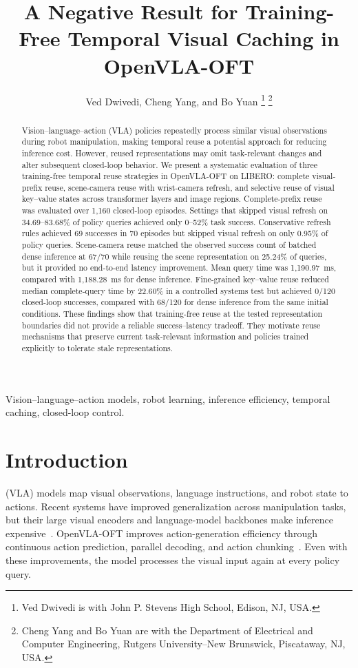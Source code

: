 \documentclass[journal]{IEEEtran}
\title{A Negative Result for Training-Free Temporal Visual Caching in OpenVLA-OFT}
\author{Ved Dwivedi, Cheng Yang, and Bo Yuan%
\thanks{Ved Dwivedi is with John P. Stevens High School, Edison, NJ, USA.}%
\thanks{Cheng Yang and Bo Yuan are with the Department of Electrical and Computer Engineering, Rutgers University--New Brunswick, Piscataway, NJ, USA.}}
\begin{document}
\maketitle

\begin{abstract}
Vision--language--action (VLA) policies repeatedly process similar visual observations during robot manipulation, making temporal reuse a potential approach for reducing inference cost. However, reused representations may omit task-relevant changes and alter subsequent closed-loop behavior. We present a systematic evaluation of three training-free temporal reuse strategies in OpenVLA-OFT on LIBERO: complete visual-prefix reuse, scene-camera reuse with wrist-camera refresh, and selective reuse of visual key--value states across transformer layers and image regions. Complete-prefix reuse was evaluated over 1,160 closed-loop episodes. Settings that skipped visual refresh on 34.69--83.68\% of policy queries achieved only 0--52\% task success. Conservative refresh rules achieved 69 successes in 70 episodes but skipped visual refresh on only 0.95\% of policy queries. Scene-camera reuse matched the observed success count of batched dense inference at 67/70 while reusing the scene representation on 25.24\% of queries, but it provided no end-to-end latency improvement. Mean query time was 1,190.97~ms, compared with 1,188.28~ms for dense inference. Fine-grained key--value reuse reduced median complete-query time by 22.60\% in a controlled systems test but achieved 0/120 closed-loop successes, compared with 68/120 for dense inference from the same initial conditions. These findings show that training-free reuse at the tested representation boundaries did not provide a reliable success--latency tradeoff. They motivate reuse mechanisms that preserve current task-relevant information and policies trained explicitly to tolerate stale representations.
\end{abstract}

\begin{IEEEkeywords}
Vision--language--action models, robot learning, inference efficiency, temporal caching, closed-loop control.
\end{IEEEkeywords}

\section{Introduction}
 (VLA) models map visual observations, language instructions, and robot state to actions. Recent systems have improved generalization across manipulation tasks, but their large visual encoders and language-model backbones make inference expensive~\cite{brohan2023rt1,zitkovich2023rt2,kim2025openvla}. OpenVLA-OFT improves action-generation efficiency through continuous action prediction, parallel decoding, and action chunking~\cite{kim2025oft}. Even with these improvements, the model processes the visual input again at every policy query.
\end{document}
